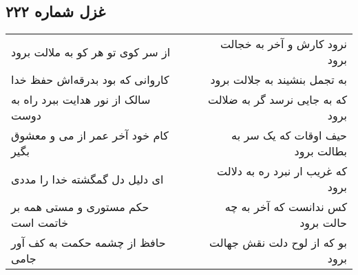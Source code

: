 \begin{center}
\section*{غزل شماره ۲۲۲}
\label{sec:sh222}
\begin{longtable}{l p{0.5cm} r}
از سر کوی تو هر کو به ملالت برود
&&
نرود کارش و آخر به خجالت برود
\\
کاروانی که بود بدرقه‌اش حفظ خدا
&&
به تجمل بنشیند به جلالت برود
\\
سالک از نور هدایت ببرد راه به دوست
&&
که به جایی نرسد گر به ضلالت برود
\\
کام خود آخر عمر از می و معشوق بگیر
&&
حیف اوقات که یک سر به بطالت برود
\\
ای دلیل دل گمگشته خدا را مددی
&&
که غریب ار نبرد ره به دلالت برود
\\
حکم مستوری و مستی همه بر خاتمت است
&&
کس ندانست که آخر به چه حالت برود
\\
حافظ از چشمه حکمت به کف آور جامی
&&
بو که از لوح دلت نقش جهالت برود
\\
\end{longtable}
\end{center}

